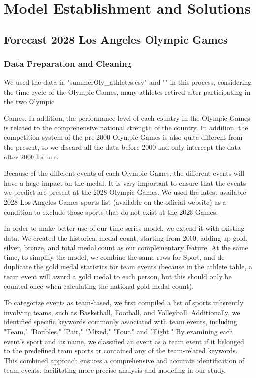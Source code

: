 \documentclass[12pt,a4paper]{article}
\begin{document}
 
    \section{Model Establishment and Solutions}
    
    \subsection{Forecast 2028 Los Angeles Olympic Games}
    
    \subsubsection{Data Preparation and Cleaning}
    
    We used the data in "summerOly\_athletes.csv" and "" in this
    process, considering the time cycle of the Olympic Games, many athletes
    retired after participating in the two Olympic
    
    
    Games. In addition, the performance level of each country in the
    Olympic Games is related to the comprehensive national strength of the
    country. In addition, the competition system of the pre-2000 Olympic
    Games is also quite different from the present, so we discard all the
    data before 2000 and only intercept the data after 2000 for use.
    
    Because of the different events of each Olympic Games, the
    different events will have a huge impact on the medal. It is very
    important to ensure that the events we predict are present at the 2028
    Olympic Games. We used the latest available 2028 Los Angeles Games
    sports list (available on the official website) as a condition to
    exclude those sports that do not exist at the 2028 Games.
    
    In order to make better use of our time series model, we extend
    it with existing data. We created the historical medal count, starting
    from 2000, adding up gold, silver, bronze, and total medal count as our
    complementary feature. At the same time, to simplify the model, we
    combine the same rows for Sport, and de-duplicate the gold medal
    statistics for team events (because in the athlete table, a team event
    will award a gold medal to each person, but this should only be counted
    once when calculating the national gold medal count).
    
    To categorize events as team-based, we first compiled a list of
    sports inherently involving teams, such as Basketball, Football, and
    Volleyball. Additionally, we identified specific keywords commonly
    associated with team events, including "Team," "Doubles," "Pair,"
    "Mixed," "Four," and "Eight." By examining each event's sport and its
    name, we classified an event as a team event if it belonged to the
    predefined team sports or contained any of the team-related keywords.
    This combined approach ensures a comprehensive and accurate
    identification of team events, facilitating more precise analysis and
    modeling in our study.
\end{document}
